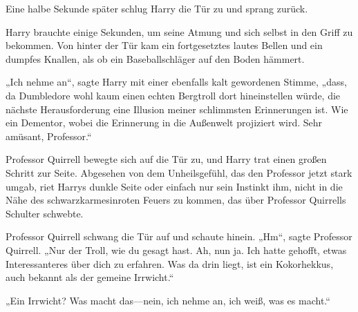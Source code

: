 \later

Eine halbe Sekunde später schlug Harry die Tür zu und sprang zurück.

Harry brauchte einige Sekunden, um seine Atmung und sich selbst in den Griff zu bekommen. Von hinter der Tür kam ein fortgesetztes lautes Bellen und ein dumpfes Knallen, als ob ein Baseballschläger auf den Boden hämmert.

„Ich nehme an“, sagte Harry mit einer ebenfalls kalt gewordenen Stimme, „dass, da Dumbledore wohl kaum einen echten Bergtroll dort hineinstellen würde, die nächste Herausforderung eine Illusion meiner schlimmsten Erinnerungen ist. Wie ein Dementor, wobei die Erinnerung in die Außenwelt projiziert wird. Sehr amüsant, Professor.“

Professor Quirrell bewegte sich auf die Tür zu, und Harry trat einen großen Schritt zur Seite. Abgesehen von dem Unheilsgefühl, das den Professor jetzt stark umgab, riet Harrys dunkle Seite oder einfach nur sein Instinkt ihm, nicht in die Nähe des schwarzkarmesinroten Feuers zu kommen, das über Professor Quirrells Schulter schwebte.

Professor Quirrell schwang die Tür auf und schaute hinein.
„Hm“, sagte Professor Quirrell. „Nur der Troll, wie du gesagt hast. Ah, nun ja. Ich hatte gehofft, etwas Interessanteres über dich zu erfahren. Was da drin liegt, ist ein Kokorhekkus, auch bekannt als der gemeine Irrwicht.“

„Ein Irrwicht? Was macht das—nein, ich nehme an, ich weiß, was es macht.“

